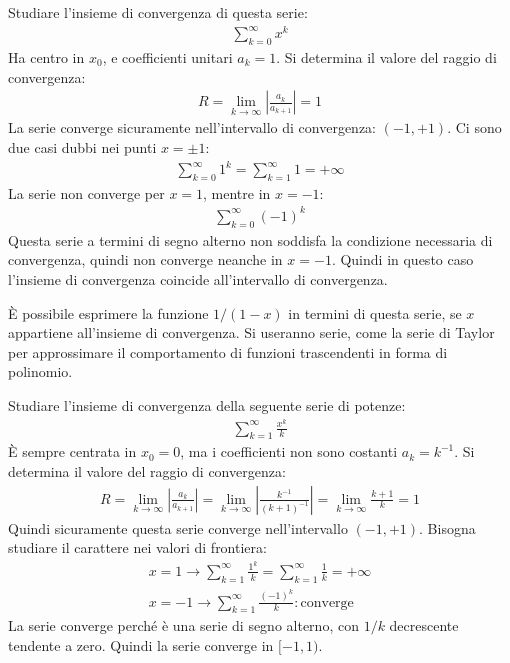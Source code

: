 \documentclass{article}
\numberwithin{equation}{subsection}
\begin{document}
Studiare l'insieme di convergenza di questa serie:
\begin{gather*}
    \displaystyle\sum_{k=0}^\infty x^k
\end{gather*}
Ha centro in $x_0$, e coefficienti unitari $a_k=1$. Si determina il valore del raggio di convergenza:
\begin{gather*}
    R=\lim_{k\to\infty}\left|\frac{a_k}{{a_{k+1}}}\right|=1
\end{gather*}
La serie converge sicuramente nell'intervallo di convergenza: $(-1,+1)$. Ci sono due casi dubbi nei punti $x=\pm1$:
\begin{gather*}
    \displaystyle\sum_{k=0}^\infty 1^k=\sum_{k=1}^\infty1=+\infty
\end{gather*}
La serie non converge per $x=1$, mentre in $x=-1$:
\begin{gather*}
    \displaystyle\sum_{k=0}^\infty (-1)^k
\end{gather*}
Questa serie a termini di segno alterno non soddisfa la condizione necessaria di convergenza, quindi non converge neanche in $x=-1$. 
Quindi in questo caso l'insieme di convergenza coincide all'intervallo di convergenza. 

È possibile esprimere la funzione $1/(1-x)$ in termini di questa serie, se $x$ appartiene all'insieme di convergenza. Si useranno serie, come la serie di Taylor per approssimare il comportamento di funzioni trascendenti in forma di polinomio. 



Studiare l'insieme di convergenza della seguente serie di potenze:
\begin{gather*}
    \displaystyle\sum_{k=1}^\infty\frac{x^k}{k}
\end{gather*}
È sempre centrata in $x_0=0$, ma i coefficienti non sono costanti $a_k=k^{-1}$. 
Si determina il valore del raggio di convergenza:
\begin{gather*}
    R=\lim_{k\to\infty}\left|\frac{a_k}{{a_{k+1}}}\right|=
    \lim_{k\to\infty}\left|\frac{k^{-1}}{{(k+1)^{-1}}}\right|=
    \lim_{k\to\infty}\frac{k+1}{k}=1
\end{gather*}
Quindi sicuramente questa serie converge nell'intervallo $(-1,+1)$. Bisogna studiare il carattere nei valori di frontiera:
\begin{gather*}
    x=1\rightarrow\displaystyle\sum_{k=1}^\infty\frac{1^k}{k}=\sum_{k=1}^\infty\frac{1}{k}=+\infty\\
    x=-1\rightarrow\displaystyle\sum_{k=1}^\infty\frac{(-1)^k}{k}:\text{converge}
\end{gather*}
La serie converge perché è una serie di segno alterno, con $1/k$ decrescente tendente a zero. Quindi la serie converge in $[-1,1)$. 
\end{document}
